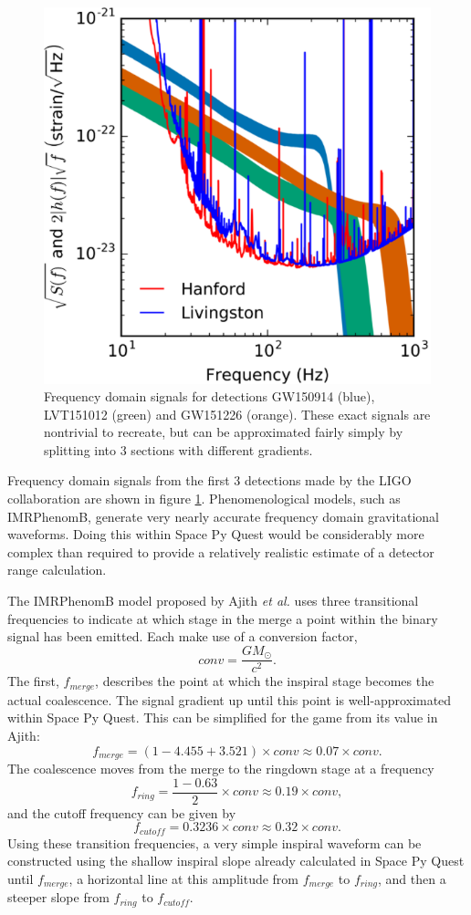 \documentclass{article}
\begin{document}
\begin{enumerate}
    \begin{figure}
    \centering
    \includegraphics[scale=0.6]{fdomsig.PNG}
    \caption{Frequency domain signals for detections GW150914 (blue),
      LVT151012 (green) and GW151226 (orange). These exact signals are
      nontrivial to recreate, but can be approximated fairly simply by
      splitting into 3 sections with different
      gradients. \cite{binary}}
    \label{fig:fdomsig}
    \end{figure}
Frequency domain signals from the first 3 detections made by the LIGO
collaboration are shown in figure \ref{fig:fdomsig}. Phenomenological
models, such as IMRPhenomB, generate very nearly accurate frequency
domain gravitational waveforms. Doing this within Space Py Quest would
be considerably more complex than required to provide a relatively
realistic estimate of a detector range calculation.

The IMRPhenomB model proposed by Ajith \textit{et al.} \cite{ajith}
uses three transitional frequencies to indicate at which stage in the
merge a point within the binary signal has been emitted. Each make use
of a conversion factor,
\[
conv = \frac{GM_{\odot}}{c^2}.
\]
The first, $f_{merge}$, describes the point at which the inspiral
stage becomes the actual coalescence. The signal gradient up until
this point is well-approximated within Space Py Quest. This can be
simplified for the game from its value in Ajith:
\[
f_{merge} = (1 - 4.455 + 3.521) \times conv \approx 0.07 \times conv .
\]
The coalescence moves from the merge to the ringdown stage at a frequency
\[
f_{ring} = \frac{1 - 0.63}{2} \times conv \approx 0.19 \times conv,
\]
and the cutoff frequency can be given by
\[
f_{cutoff} = 0.3236 \times conv \approx 0.32 \times conv.
\]
Using these transition frequencies, a very simple inspiral waveform
can be constructed using the shallow inspiral slope already calculated
in Space Py Quest until $f_{merge}$, a horizontal line at this
amplitude from $f_{merge}$ to $f_{ring}$, and then a steeper slope
from $f_{ring}$ to $f_{cutoff}$. 
\end{enumerate}
\end{document}
